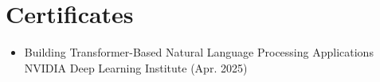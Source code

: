 \section{Certificates}
\begin{itemize}
  \item Building Transformer-Based Natural Language Processing Applications\\NVIDIA Deep Learning Institute (Apr. 2025)
\end{itemize}
